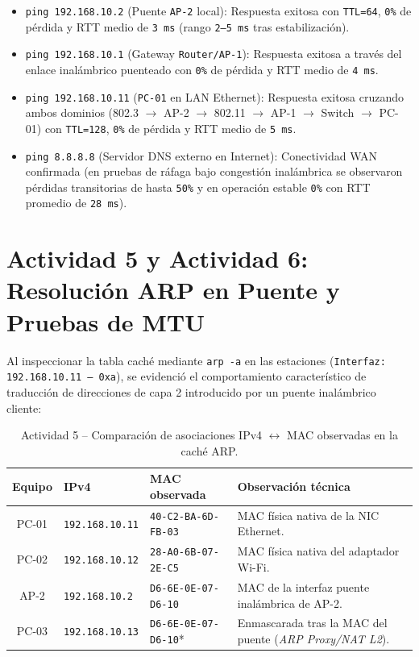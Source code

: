 \documentclass[11pt, a4paper]{article}
\begin{document}
\begin{itemize}
    \item \texttt{ping 192.168.10.2} (Puente \texttt{AP-2} local): Respuesta exitosa con \texttt{TTL=64}, \texttt{0\%} de pérdida y RTT medio de \texttt{3 ms} (rango \texttt{2--5 ms} tras estabilización).
    \item \texttt{ping 192.168.10.1} (Gateway \texttt{Router/AP-1}): Respuesta exitosa a través del enlace inalámbrico puenteado con \texttt{0\%} de pérdida y RTT medio de \texttt{4 ms}.
    \item \texttt{ping 192.168.10.11} (\texttt{PC-01} en LAN Ethernet): Respuesta exitosa cruzando ambos dominios (802.3 $\rightarrow$ AP-2 $\rightarrow$ 802.11 $\rightarrow$ AP-1 $\rightarrow$ Switch $\rightarrow$ PC-01) con \texttt{TTL=128}, \texttt{0\%} de pérdida y RTT medio de \texttt{5 ms}.
    \item \texttt{ping 8.8.8.8} (Servidor DNS externo en Internet): Conectividad WAN confirmada (en pruebas de ráfaga bajo congestión inalámbrica se observaron pérdidas transitorias de hasta \texttt{50\%} y en operación estable \texttt{0\%} con RTT promedio de \texttt{28 ms}).
\end{itemize}

\section{Actividad 5 y Actividad 6: Resolución ARP en Puente y Pruebas de MTU}

Al inspeccionar la tabla caché mediante \texttt{arp -a} en las estaciones (\texttt{Interfaz: 192.168.10.11 --- 0xa}), se evidenció el comportamiento característico de traducción de direcciones de capa 2 introducido por un puente inalámbrico cliente:

\begin{table}[h!]
\centering
\small
\setlength{\tabcolsep}{4pt}
\caption{Actividad 5 -- Comparación de asociaciones IPv4 $\leftrightarrow$ MAC observadas en la caché ARP.}
\begin{tabularx}{\textwidth}{c >{\centering\arraybackslash}X >{\centering\arraybackslash}X >{\raggedright\arraybackslash}X}
\toprule
\textbf{Equipo} & \textbf{IPv4} & \textbf{MAC observada} & \textbf{Observación técnica} \\
\midrule
PC-01 & \texttt{192.168.10.11} & \texttt{40-C2-BA-6D-FB-03} & MAC física nativa de la NIC Ethernet. \\
PC-02 & \texttt{192.168.10.12} & \texttt{28-A0-6B-07-2E-C5} & MAC física nativa del adaptador Wi-Fi. \\
AP-2  & \texttt{192.168.10.2}  & \texttt{D6-6E-0E-07-D6-10} & MAC de la interfaz puente inalámbrica de AP-2. \\
PC-03 & \texttt{192.168.10.13} & \texttt{D6-6E-0E-07-D6-10}* & Enmascarada tras la MAC del puente (\textit{ARP Proxy/NAT L2}). \\
\bottomrule
\end{tabularx}
\end{table}
\end{document}
